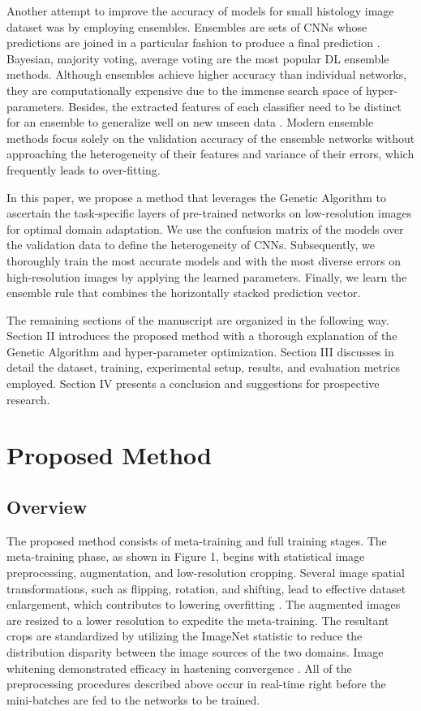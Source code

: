 \documentclass[a4paper, 12 pt, conference]{ieeeconf}
\begin{document}
\quad Another attempt to improve the accuracy of models for small histology image dataset was by employing ensembles. Ensembles are sets of CNNs whose predictions are joined in a particular fashion to produce a final prediction \cite{Dietterich2000}. Bayesian, majority voting, average voting are the most popular DL ensemble methods\cite{Dietterich2000, Nanni2018}. Although ensembles achieve higher accuracy than individual networks, they are computationally expensive due to the immense search space of hyper-parameters. Besides, the extracted features of each classifier need to be distinct for an ensemble to generalize well on new unseen data \cite{Dietterich2000, Nanni2018}. Modern ensemble methods focus solely on the validation accuracy of the ensemble networks without approaching the heterogeneity of their features and variance of their errors, which frequently leads to over-fitting.

\quad In this paper, we propose a method that leverages the Genetic Algorithm to ascertain the task-specific layers of pre-trained networks on low-resolution images for optimal domain adaptation. We use the confusion matrix of the models over the validation data to define the heterogeneity of CNNs. Subsequently, we thoroughly train the most accurate models and with the most diverse errors on high-resolution images by applying the learned parameters. Finally, we learn the ensemble rule that combines the horizontally stacked prediction vector.

\quad The remaining sections of the manuscript are organized in the following way. Section II introduces the proposed method with a thorough explanation of the Genetic Algorithm and hyper-parameter optimization. Section III discusses in detail the dataset, training, experimental setup, results,  and evaluation metrics employed. Section IV presents a conclusion and suggestions for prospective research.

\section{Proposed Method}
\subsection{Overview}


	\quad 		The proposed method consists of meta-training and full training stages. The meta-training phase, as shown in Figure 1, begins with statistical image preprocessing, augmentation, and low-resolution cropping.   Several image spatial transformations, such as flipping, rotation, and shifting, lead to effective dataset enlargement, which contributes to lowering overfitting \cite{Perez2017}. The augmented images are resized to a lower resolution to expedite the meta-training. The resultant crops are standardized by utilizing the ImageNet statistic to reduce the distribution disparity between the image sources of the two domains. Image whitening demonstrated efficacy in hastening convergence \cite{Lecun1998}. All of the preprocessing procedures described above occur in real-time right before the mini-batches are fed to the networks to be trained.
\end{document}
